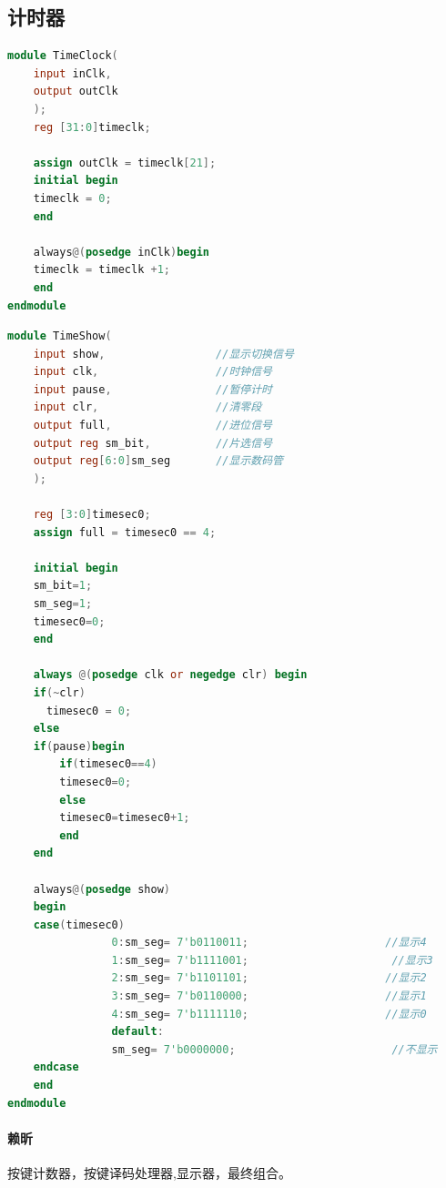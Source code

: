 \documentclass[a4paper,11pt]{ctexart}
\begin{document}
\subsection{计时器}
\begin{lstlisting}[language={verilog}]
module TimeClock(
    input inClk,
    output outClk
    );
    reg [31:0]timeclk;

    assign outClk = timeclk[21];
    initial begin
    timeclk = 0;
    end

    always@(posedge inClk)begin
    timeclk = timeclk +1;
    end
endmodule
\end{lstlisting}
\begin{lstlisting}[language={verilog}]
module TimeShow(
    input show,                 //显示切换信号
    input clk,                  //时钟信号
    input pause,                //暂停计时
    input clr,                  //清零段
    output full,                //进位信号
    output reg sm_bit,          //片选信号
    output reg[6:0]sm_seg       //显示数码管
    );

    reg [3:0]timesec0;
    assign full = timesec0 == 4;

    initial begin
    sm_bit=1;
    sm_seg=1;
    timesec0=0;
    end

    always @(posedge clk or negedge clr) begin
    if(~clr)
      timesec0 = 0;
    else
    if(pause)begin
        if(timesec0==4)
        timesec0=0;
        else
        timesec0=timesec0+1;
        end
    end

    always@(posedge show)
    begin
    case(timesec0)
                0:sm_seg= 7'b0110011;                     //显示4
                1:sm_seg= 7'b1111001;                      //显示3
                2:sm_seg= 7'b1101101;                     //显示2
                3:sm_seg= 7'b0110000;                     //显示1
                4:sm_seg= 7'b1111110;                     //显示0
                default:
                sm_seg= 7'b0000000;                        //不显示
    endcase
    end
endmodule
\end{lstlisting}

\paragraph{赖昕}按键计数器，按键译码处理器,显示器，最终组合。
\end{document}
